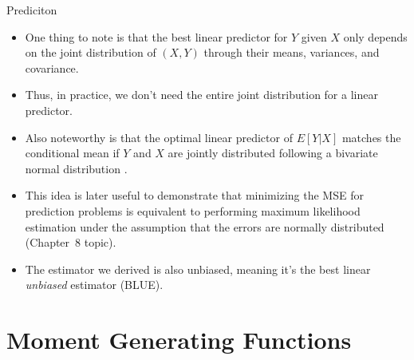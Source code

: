 \begin{frame}[allowframebreaks]{Prediciton}
\begin{itemize}
    \framebreak
    
    \item One thing to note is that the best linear predictor for $Y$ given $X$ only depends on the joint distribution of $(X, Y)$ through their means, variances, and covariance.
    \item Thus, in practice, we don't need the entire joint distribution for a linear predictor.
    \item Also noteworthy is that the optimal linear predictor of $E[Y|X]$ matches the conditional mean if $Y$ and $X$ are jointly distributed following a bivariate normal distribution \citep[See Example 4.1.1 B,][]{rice07}.
    \item This idea is later useful to demonstrate that minimizing the MSE for prediction problems is equivalent to performing maximum likelihood estimation under the assumption that the errors are normally distributed (Chapter~8 topic).
    \item The estimator we derived is also \alert{unbiased}, meaning it's the best linear \emph{unbiased} estimator (BLUE).
  \end{itemize}
  
\end{frame}

\section{Moment Generating Functions}

